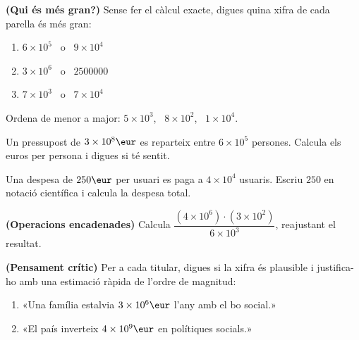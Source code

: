 \begin{exercicis}
\begin{exlist}
  \item \textbf{(Qui és més gran?)} Sense fer el càlcul exacte, digues quina xifra de
        cada parella és més gran:
        \begin{enumerate}[label=\alph*), leftmargin=1.6em, topsep=2pt]
          \item $6\times 10^{5}$ \ o \ $9\times 10^{4}$
          \item $3\times 10^{6}$ \ o \ $\num{2500000}$
          \item $7\times 10^{3}$ \ o \ $7\times 10^{4}$
        \end{enumerate}
  \item Ordena de menor a major: $5\times 10^{3}$, \ $8\times 10^{2}$, \ $1\times 10^{4}$.
  \item Un pressupost de $3\times 10^{8}\eur$ es reparteix entre $6\times 10^{5}$
        persones. Calcula els euros per persona i digues si té sentit.
  \item Una despesa de $250\eur$ per usuari es paga a $4\times 10^{4}$ usuaris. Escriu
        $250$ en notació científica i calcula la despesa total.
  \item \textbf{(Operacions encadenades)} Calcula
        $\dfrac{(4\times 10^{6})\cdot(3\times 10^{2})}{6\times 10^{3}}$, reajustant el
        resultat.
  \item \textbf{(Pensament crític)} Per a cada titular, digues si la xifra és plausible
        i justifica-ho amb una estimació ràpida de l'ordre de magnitud:
        \begin{enumerate}[label=\alph*), leftmargin=1.6em, topsep=2pt]
          \item «Una família estalvia $3\times 10^{6}\eur$ l'any amb el bo social.»
          \item «El país inverteix $4\times 10^{9}\eur$ en polítiques socials.»
        \end{enumerate}
\end{exlist}
\end{exercicis}

